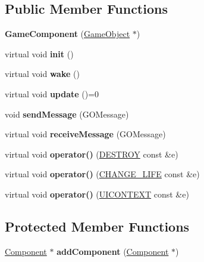 \subsection*{Public Member Functions}
\begin{DoxyCompactItemize}
\item 
\hypertarget{class_game_component_a2323370728584eb85a822086605e0a09}{}\label{class_game_component_a2323370728584eb85a822086605e0a09} 
{\bfseries Game\+Component} (\hyperlink{class_game_object}{Game\+Object} $\ast$)
\item 
\hypertarget{class_game_component_ae602abc2eed3c565f410548aad7ee14e}{}\label{class_game_component_ae602abc2eed3c565f410548aad7ee14e} 
virtual void {\bfseries init} ()
\item 
\hypertarget{class_game_component_a3334ffc79f717357970abfbdb7eb4024}{}\label{class_game_component_a3334ffc79f717357970abfbdb7eb4024} 
virtual void {\bfseries wake} ()
\item 
\hypertarget{class_game_component_a65fc004cd4dc7593052327ff874bb2f0}{}\label{class_game_component_a65fc004cd4dc7593052327ff874bb2f0} 
virtual void {\bfseries update} ()=0
\item 
\hypertarget{class_game_component_a30bad20d9395895883bb75b998e9c974}{}\label{class_game_component_a30bad20d9395895883bb75b998e9c974} 
void {\bfseries send\+Message} (G\+O\+Message)
\item 
\hypertarget{class_game_component_a449c4a683e9bb42e0ab939a06e7b0640}{}\label{class_game_component_a449c4a683e9bb42e0ab939a06e7b0640} 
virtual void {\bfseries receive\+Message} (G\+O\+Message)
\item 
\hypertarget{class_game_component_a08f10c1b2271188ac5234f7b43443b8b}{}\label{class_game_component_a08f10c1b2271188ac5234f7b43443b8b} 
virtual void {\bfseries operator()} (\hyperlink{struct_d_e_s_t_r_o_y}{D\+E\+S\+T\+R\+OY} const \&e)
\item 
\hypertarget{class_game_component_a64f76f90b5f53dd87bf3318aef852c95}{}\label{class_game_component_a64f76f90b5f53dd87bf3318aef852c95} 
virtual void {\bfseries operator()} (\hyperlink{struct_c_h_a_n_g_e___l_i_f_e}{C\+H\+A\+N\+G\+E\+\_\+\+L\+I\+FE} const \&e)
\item 
\hypertarget{class_game_component_a1c7bb1ad02f664b16cd7edf5b49db3fd}{}\label{class_game_component_a1c7bb1ad02f664b16cd7edf5b49db3fd} 
virtual void {\bfseries operator()} (\hyperlink{struct_u_i_c_o_n_t_e_x_t}{U\+I\+C\+O\+N\+T\+E\+XT} const \&e)
\end{DoxyCompactItemize}
\subsection*{Protected Member Functions}
\begin{DoxyCompactItemize}
\item 
\hypertarget{class_game_component_abeecc14e2cd29b7ec83d74aabfe4403b}{}\label{class_game_component_abeecc14e2cd29b7ec83d74aabfe4403b} 
\hyperlink{class_component}{Component} $\ast$ {\bfseries add\+Component} (\hyperlink{class_component}{Component} $\ast$)
\end{DoxyCompactItemize}
